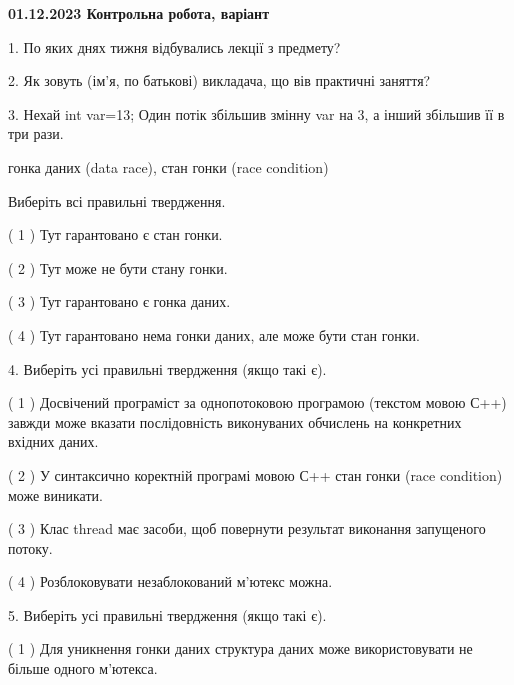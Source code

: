 \documentclass[12pt, ukrainian]{article}
\begin{document}
\vspace{4mm}
\newpage
\begin {large}

\textbf{01.12.2023 Контрольна робота, варіант  }\par


{
1. По яких днях тижня відбувались лекції з предмету?



\vspace{5mm}
2. Як зовуть (ім'я, по батькові) викладача, що вів практичні заняття?



\vspace{5mm}
3. Нехай int var=13; Один потік збільшив змінну var на 3, а інший збільшив її в три рази.

гонка даних (data race), стан гонки (race condition)

Виберіть всі правильні твердження.\par
\vspace{2mm}
( 1 ) Тут гарантовано є стан гонки.%

( 2 ) Тут може не бути стану гонки.%

( 3 ) Тут гарантовано є гонка даних.%

( 4 ) Тут гарантовано нема гонки даних, але може бути стан гонки.%


\vspace{5mm}
4. Виберіть усі правильні твердження (якщо такі є).\par
\vspace{2mm}

( 1 ) Досвічений програміст за однопотоковою програмою (текстом мовою С++) завжди може вказати послідовність виконуваних обчислень на конкретних вхідних даних.%

( 2 ) У синтаксично коректній програмі мовою С++ стан гонки (race condition) може виникати.%

( 3 ) Клас thread має засоби, щоб повернути результат виконання запущеного потоку.%

( 4 ) Розблоковувати незаблокований м’ютекс можна.%


\vspace{5mm}
5. Виберіть усі правильні твердження (якщо такі є).\par
\vspace{2mm}

( 1 ) Для уникнення гонки даних структура даних може використовувати не більше одного м’ютекса.%

}
\end{large}
\end{document}
